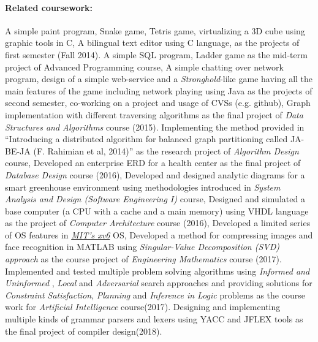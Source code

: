 \paragraph{Related coursework:} A simple paint program, Snake game, Tetris game, virtualizing a 3D cube using graphic tools in C, A bilingual text editor using C language, as the projects of first semester (Fall 2014). A simple SQL program, Ladder game as the mid-term project of Advanced Programming course, A simple chatting over network program, design of a simple web-service and a \textit{Stronghold}-like game having all the main features of the game including network playing using Java as the projects of second semester, co-working on a project and usage of CVSs (e.g. github), Graph implementation with different traversing algorithms as the final project of \textit{Data Structures and Algorithms} course (2015). Implementing the method provided in ``Introducing a distributed algorithm for balanced graph partitioning called JA-BE-JA (F. Rahimian et al, 2014)'' as the research project of \textit{Algorithm Design} course, Developed an enterprise ERD for a health center as the final project of \textit{Database Design} course (2016), Developed and designed analytic diagrams for a smart greenhouse environment using methodologies introduced in \textit{System Analysis and Design (Software Engineering I)} course, Designed and simulated a base computer (a CPU with a cache and a main memory) using VHDL language as the project of \textit{Computer Architecture} course (2016), Developed a limited series of OS features in \textit{\href{https://github.com/mit-pdos/xv6-public}{MIT’s xv6}} OS, Developed a method for compressing images and face recognition in MATLAB using \textit{Singular-Value Decomposition (SVD) approach} as the course project of \textit{Engineering Mathematics} course (2017). Implemented and tested multiple problem solving algorithms using \textit{Informed and Uninformed} , \textit{Local} and \textit{Adversarial} search approaches and providing solutions for \textit{Constraint Satisfaction}, \textit{Planning} and \textit{Inference in Logic} problems as the course work for \textit{Artificial Intelligence} course(2017). Designing and implementing multiple kinds of grammar parsers and lexers using YACC and JFLEX tools as the final project of compiler design(2018). \\
